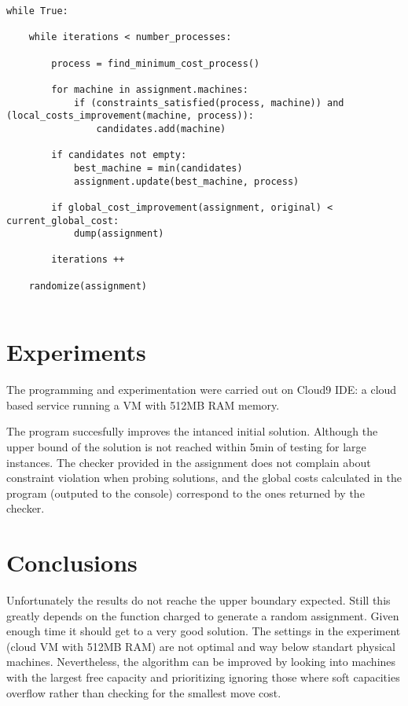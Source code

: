 \documentclass[11pt]{article}   %
\begin{document}
\begin{lstlisting}
while True:
    
    while iterations < number_processes:
        
        process = find_minimum_cost_process()
        
        for machine in assignment.machines:
            if (constraints_satisfied(process, machine)) and (local_costs_improvement(machine, process)):
                candidates.add(machine)
        
        if candidates not empty:
            best_machine = min(candidates)        
            assignment.update(best_machine, process)
        
        if global_cost_improvement(assignment, original) < current_global_cost:
            dump(assignment)    
        
        iterations ++
    
    randomize(assignment)
    
\end{lstlisting}



\section{Experiments}   

The programming and experimentation were carried out on Cloud9 IDE: a cloud based service running a VM with 512MB RAM memory.

The program succesfully improves the intanced initial solution. Although the upper bound of the solution is not reached within 5min of testing for large instances.
The checker provided in the assignment does not complain about constraint violation when probing solutions,
and the global costs calculated in the program (outputed to the console) correspond to the ones returned by the checker.

\section{Conclusions}         

Unfortunately the results do not reache the upper boundary expected. Still this greatly depends on the
function charged to generate a random assignment. Given enough time it should get to a very good solution.
The settings in the experiment (cloud VM with 512MB RAM) are not optimal and way below standart physical machines.
Nevertheless, the algorithm can be improved by looking into machines with the largest free capacity and prioritizing ignoring
those where soft capacities overflow rather than checking for the smallest move cost.

\end{document}
